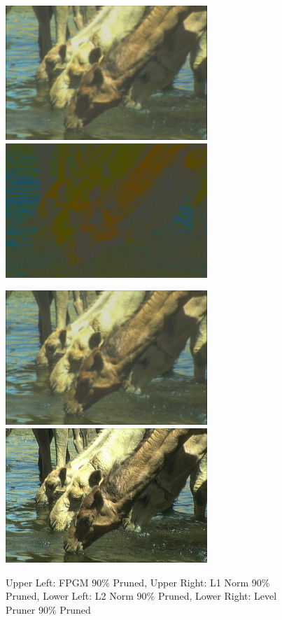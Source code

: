 \documentclass{article}
\begin{document}
\begin{figure}
	\centerline{\includegraphics[width=3in]{../final/figures/camel_fpgm_90.jpg}\includegraphics[width=3in]{../final/figures/camel_l1norm_90.jpg}}
	\centerline{\includegraphics[width=3in]{../final/figures/camel_l2norm_90.jpg}\includegraphics[width=3in]{../final/figures/camel_level_90.jpg}}
	\caption{Upper Left: FPGM 90\% Pruned, Upper Right: L1 Norm 90\% Pruned, Lower Left: L2 Norm 90\% Pruned, Lower Right: Level Pruner 90\% Pruned}
	\label{fig:pruned}
\end{figure}
\end{document}
